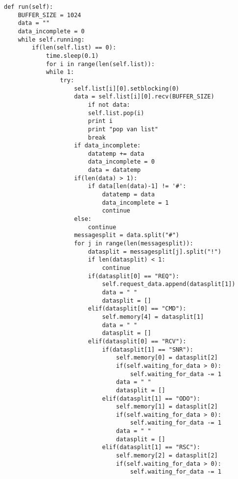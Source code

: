 \documentclass[a4paper,10pt]{article}
\begin{document}
\begin{verbatim}
def run(self):
    BUFFER_SIZE = 1024
    data = ""
    data_incomplete = 0
    while self.running:
        if(len(self.list) == 0):
            time.sleep(0.1)
            for i in range(len(self.list)):
            while 1:
                try:
                    self.list[i][0].setblocking(0)
                    data = self.list[i][0].recv(BUFFER_SIZE)
                        if not data:
                        self.list.pop(i)
                        print i
                        print "pop van list"
                        break
                    if data_incomplete:
                        datatemp += data
                        data_incomplete = 0
                        data = datatemp
                    if(len(data) > 1):
                        if data[len(data)-1] != '#':
                            datatemp = data
                            data_incomplete = 1
                            continue
                    else:
                        continue
                    messagesplit = data.split("#")
                    for j in range(len(messagesplit)):
                        datasplit = messagesplit[j].split("!")
                        if len(datasplit) < 1:
                            continue
                        if(datasplit[0] == "REQ"):
                            self.request_data.append(datasplit[1])
                            data = " "
                            datasplit = []
                        elif(datasplit[0] == "CMD"):
                            self.memory[4] = datasplit[1]
                            data = " "
                            datasplit = []
                        elif(datasplit[0] == "RCV"):
                            if(datasplit[1] == "SNR"):
                                self.memory[0] = datasplit[2]
                                if(self.waiting_for_data > 0):
                                    self.waiting_for_data -= 1
                                data = " "
                                datasplit = []
                            elif(datasplit[1] == "ODO"):
                                self.memory[1] = datasplit[2]
                                if(self.waiting_for_data > 0):
                                    self.waiting_for_data -= 1
                                data = " "
                                datasplit = []
                            elif(datasplit[1] == "RSC"):
                                self.memory[2] = datasplit[2]
                                if(self.waiting_for_data > 0):
                                    self.waiting_for_data -= 1

\end{verbatim}
\end{document}
